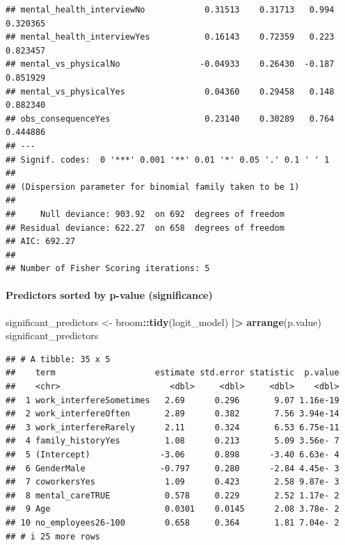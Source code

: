 \documentclass[
]{article}
\newenvironment{Shaded}{\begin{snugshade}}{\end{snugshade}}
\newcommand{\FunctionTok}[1]{\textcolor[rgb]{0.13,0.29,0.53}{\textbf{#1}}}
\newcommand{\NormalTok}[1]{#1}
\newcommand{\OtherTok}[1]{\textcolor[rgb]{0.56,0.35,0.01}{#1}}
\newcommand{\SpecialCharTok}[1]{\textcolor[rgb]{0.81,0.36,0.00}{\textbf{#1}}}
\begin{document}
\begin{verbatim}
## mental_health_interviewNo            0.31513    0.31713   0.994 0.320365    
## mental_health_interviewYes           0.16143    0.72359   0.223 0.823457    
## mental_vs_physicalNo                -0.04933    0.26430  -0.187 0.851929    
## mental_vs_physicalYes                0.04360    0.29458   0.148 0.882340    
## obs_consequenceYes                   0.23140    0.30289   0.764 0.444886    
## ---
## Signif. codes:  0 '***' 0.001 '**' 0.01 '*' 0.05 '.' 0.1 ' ' 1
## 
## (Dispersion parameter for binomial family taken to be 1)
## 
##     Null deviance: 903.92  on 692  degrees of freedom
## Residual deviance: 622.27  on 658  degrees of freedom
## AIC: 692.27
## 
## Number of Fisher Scoring iterations: 5
\end{verbatim}

\paragraph{Predictors sorted by p-value
(significance)}\label{predictors-sorted-by-p-value-significance}

\begin{Shaded}
\begin{Highlighting}[]
\NormalTok{significant\_predictors }\OtherTok{\textless{}{-}}\NormalTok{ broom}\SpecialCharTok{::}\FunctionTok{tidy}\NormalTok{(logit\_model) }\SpecialCharTok{|\textgreater{}}
  \FunctionTok{arrange}\NormalTok{(p.value)}
\NormalTok{significant\_predictors}
\end{Highlighting}
\end{Shaded}

\begin{verbatim}
## # A tibble: 35 x 5
##    term                    estimate std.error statistic  p.value
##    <chr>                      <dbl>     <dbl>     <dbl>    <dbl>
##  1 work_interfereSometimes   2.69      0.296       9.07 1.16e-19
##  2 work_interfereOften       2.89      0.382       7.56 3.94e-14
##  3 work_interfereRarely      2.11      0.324       6.53 6.75e-11
##  4 family_historyYes         1.08      0.213       5.09 3.56e- 7
##  5 (Intercept)              -3.06      0.898      -3.40 6.63e- 4
##  6 GenderMale               -0.797     0.280      -2.84 4.45e- 3
##  7 coworkersYes              1.09      0.423       2.58 9.87e- 3
##  8 mental_careTRUE           0.578     0.229       2.52 1.17e- 2
##  9 Age                       0.0301    0.0145      2.08 3.78e- 2
## 10 no_employees26-100        0.658     0.364       1.81 7.04e- 2
## # i 25 more rows
\end{verbatim}
\end{document}
